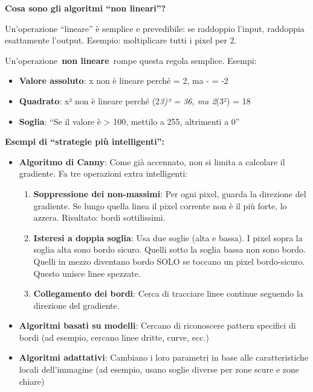 \documentclass[
]{article}
\providecommand{\tightlist}{%
  \setlength{\itemsep}{0pt}\setlength{\parskip}{0pt}}
\begin{document}
\textbf{Cosa sono gli algoritmi ``non lineari''?}

Un'operazione ``lineare'' è semplice e prevedibile: se raddoppio l'input, raddoppia esattamente l'output. Esempio: moltiplicare tutti i pixel per 2.

Un'operazione~\textbf{non lineare}~rompe questa regola semplice. Esempi:

\begin{itemize}
\tightlist
\item
  \textbf{Valore assoluto}: \textbar x\textbar{} non è lineare perché \textbar{} = 2, ma -\textbar{} = -2
\item
  \textbf{Quadrato}: x² non è lineare perché (2\emph{3)² = 36, ma 2}(3²) = 18
\item
  \textbf{Soglia}: ``Se il valore è \textgreater{} 100, mettilo a 255, altrimenti a 0''
\end{itemize}

\textbf{Esempi di ``strategie più intelligenti'':}

\begin{itemize}
\tightlist
\item
  \textbf{Algoritmo di Canny}: Come già accennato, non si limita a calcolare il gradiente. Fa tre operazioni extra intelligenti:

  \begin{enumerate}
  \def\labelenumi{\arabic{enumi}.}
  \tightlist
  \item
    \textbf{Soppressione dei non-massimi}: Per ogni pixel, guarda la direzione del gradiente. Se lungo quella linea il pixel corrente non è il più forte, lo azzera. Risultato: bordi sottilissimi.
  \item
    \textbf{Isteresi a doppia soglia}: Usa due soglie (alta e bassa). I pixel sopra la soglia alta sono bordo sicuro. Quelli sotto la soglia bassa non sono bordo. Quelli in mezzo diventano bordo SOLO se toccano un pixel bordo-sicuro. Questo unisce linee spezzate.
  \item
    \textbf{Collegamento dei bordi}: Cerca di tracciare linee continue seguendo la direzione del gradiente.
  \end{enumerate}
\item
  \textbf{Algoritmi basati su modelli}: Cercano di riconoscere pattern specifici di bordi (ad esempio, cercano linee dritte, curve, ecc.)
\item
  \textbf{Algoritmi adattativi}: Cambiano i loro parametri in base alle caratteristiche locali dell'immagine (ad esempio, usano soglie diverse per zone scure e zone chiare)
\end{itemize}
\end{document}
